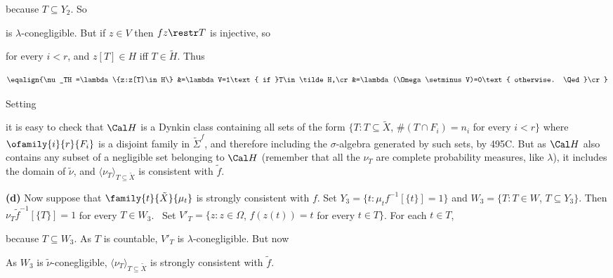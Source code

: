 {

\noindent because $T\subseteq Y_2$.   So


\noindent is $\lambda$-conegligible.   But if $z\in V$ then $fz\restr T$
is injective, so


\noindent for every $i<r$, and $z[T]\in H$ iff $T\in\tilde H$.
Thus

$$\eqalign{\nu_TH
=\lambda\{z:z[T]\in H\}
&=\lambda V=1\text{ if }T\in\tilde H,\cr
&=\lambda(\Omega\setminus V)=0\text{ otherwise.  \Qed}\cr}$$

Setting


\noindent it is easy to check that $\Cal H$ is a Dynkin class containing
all sets of the form
$\{T:T\subseteq\tilde X$, $\#(T\cap F_i)=n_i$ for every $i<r\}$ where
$\ofamily{i}{r}{F_i}$ is a disjoint family in $\tilde\Sigma^f$, and
therefore including the $\sigma$-algebra generated by such sets, by
495C.   But as $\Cal H$ also contains any subset of a negligible set
belonging to $\Cal H$ (remember that all the $\nu_T$ are complete
probability measures, like $\lambda$), it includes the domain of
$\tilde\nu$, and $\langle\nu_T\rangle_{T\subseteq\tilde X}$ is
consistent with $\tilde f$.

\medskip

{\bf (d)} Now suppose that $\family{t}{\tilde X}{\mu_t}$ is strongly
consistent with $f$.   Set $Y_3=\{t:\mu_tf^{-1}[\{t\}]=1\}$ and
$W_3=\{T:T\in W$, $T\subseteq Y_3\}$.   Then
$\nu_T\tilde f^{-1}[\{T\}]=1$ for every $T\in W_3$.   \Prf\ Set
$V'_T=\{z:z\in\Omega$, $f(z(t))=t$ for every $t\in T\}$.   For
each $t\in T$,


\noindent because $T\subseteq W_3$.   As $T$ is countable, $V'_T$ is
$\lambda$-conegligible.   But now


As $W_3$ is $\tilde\nu$-conegligible,
$\langle\nu_T\rangle_{T\subseteq\tilde X}$ is strongly consistent with
$\tilde f$.
}%

